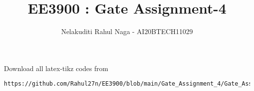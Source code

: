 \documentclass[journal,12pt,twocolumn]{IEEEtran}
\DeclareMathOperator*{\Res}{Res}
\begin{document}
\newcommand{\BEQA}{\begin{eqnarray}}
\newcommand{\EEQA}{\end{eqnarray}}
\newcommand{\define}{\stackrel{\triangle}{=}}

\raggedbottom
\setlength{\parindent}{0pt}
\providecommand{\mbf}{\mathbf}
\providecommand{\pr}[1]{\ensuremath{\Pr\left(#1\right)}}
\providecommand{\qfunc}[1]{\ensuremath{Q\left(#1\right)}}
\providecommand{\sbrak}[1]{\ensuremath{{}\left[#1\right]}}
\providecommand{\lsbrak}[1]{\ensuremath{{}\left[#1\right.}}
\providecommand{\rsbrak}[1]{\ensuremath{{}\left.#1\right]}}
\providecommand{\brak}[1]{\ensuremath{\left(#1\right)}}
\providecommand{\lbrak}[1]{\ensuremath{\left(#1\right.}}
\providecommand{\rbrak}[1]{\ensuremath{\left.#1\right)}}
\providecommand{\cbrak}[1]{\ensuremath{\left\{#1\right\}}}
\providecommand{\lcbrak}[1]{\ensuremath{\left\{#1\right.}}
\providecommand{\rcbrak}[1]{\ensuremath{\left.#1\right\}}}
\theoremstyle{remark}
\newtheorem{rem}{Remark}
\newcommand{\sgn}{\mathop{\mathrm{sgn}}}
\providecommand{\abs}[1]{\vert#1\vert}
\providecommand{\res}[1]{\Res\displaylimits_{#1}} 
\providecommand{\norm}[1]{\lVert#1\rVert}
\providecommand{\mtx}[1]{\mathbf{#1}}
\providecommand{\mean}[1]{E[ #1 ]}
\providecommand{\fourier}{\overset{\mathcal{F}}{ \rightleftharpoons}}
\providecommand{\system}{\overset{\mathcal{H}}{ \longleftrightarrow}}
\newcommand{\solution}{\noindent \textbf{Solution: }}
\newcommand{\cosec}{\,\text{cosec}\,}
\providecommand{\dec}[2]{\ensuremath{\overset{#1}{\underset{#2}{\gtrless}}}}
\newcommand{\myvec}[1]{\ensuremath{\begin{pmatrix}#1\end{pmatrix}}}
\newcommand{\mydet}[1]{\ensuremath{\begin{vmatrix}#1\end{vmatrix}}}
\makeatletter
{}
\makeatother
\let\StandardTheFigure\thefigure
\let\vec\mathbf
\renewcommand{\thefigure}{\theproblem}
\def\putbox#1#2#3{\makebox[0in][l]{\makebox[#1][l]{}\raisebox{\baselineskip}[0in][0in]{\raisebox{#2}[0in][0in]{#3}}}}
     \def\rightbox#1{\makebox[0in][r]{#1}}
     \def\centbox#1{\makebox[0in]{#1}}
     \def\topbox#1{\raisebox{-\baselineskip}[0in][0in]{#1}}
     \def\midbox#1{\raisebox{-0.5\baselineskip}[0in][0in]{#1}}
\vspace{3cm}
\title{ EE3900 : Gate Assignment-4}
\author{Nelakuditi Rahul Naga - AI20BTECH11029}
\maketitle
\newpage
\bigskip
\renewcommand{\thefigure}{\theenumi}
\renewcommand{\thetable}{\theenumi}
Download all latex-tikz codes from 
%
\begin{lstlisting}
https://github.com/Rahul27n/EE3900/blob/main/Gate_Assignment_4/Gate_Assignment_4.tex
\end{lstlisting}
\vspace{0.5cm}
\end{document}
